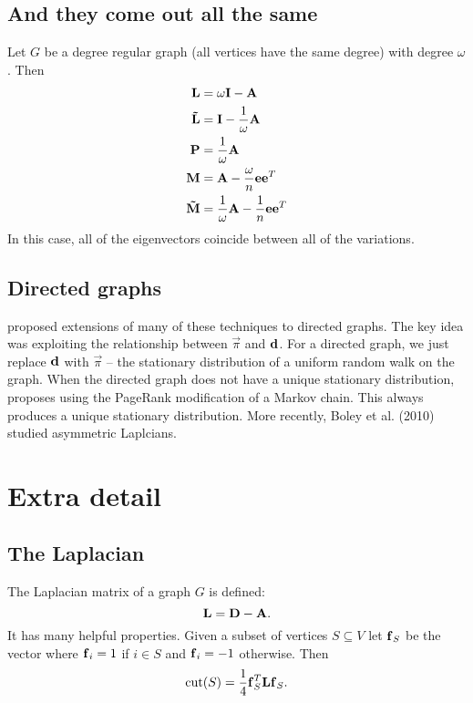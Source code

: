 \documentclass[nofonts]{dgleich-article}
\DeclareMathOperator{\cut}{cut}
\newcommand{\mnL}{\mat{\tilde{L}}}
\newcommand{\mnM}{\mat{\tilde{M}}}
\newcommand{\meye}{\mI}
\renewcommand{\vpi}{\vec{\pi}}
\begin{document}
\subsection{And they come out all the same}

Let $G$ be a degree regular graph (all vertices have
the same degree) with degree $\omega$.  Then 
\[ \begin{aligned}
    \mL & = \omega \meye - \mA \\
    \mnL & = \meye - \frac{1}{\omega} \mA \\
    \mP & = \frac{1}{\omega} \mA \\
    \mM & = \mA - \frac{\omega}{n} \ve \ve^T \\
    \mnM & = \frac{1}{\omega} \mA - \frac{1}{n} \ve \ve^T 
   \end{aligned} \]
In this case, all of the eigenvectors coincide between
all of the variations.  

\subsection{Directed graphs}

\citet{Chung2005-directed-laplacian} proposed extensions of many of these 
techniques to directed graphs.  
The key idea was exploiting the relationship between $\vpi$ and $\boldsymbol{\mathrm{d}}$.
For a directed graph, we just replace $\boldsymbol{\mathrm{d}}$ with $\vpi$ -- the stationary 
distribution of a uniform random walk on the graph.
When the directed graph does not have a unique stationary distribution,
\citet{zhou2005-directed-learning} proposes using the PageRank
modification of a Markov chain.  This always produces a unique stationary
distribution.  More recently, Boley et al. (2010)
studied asymmetric Laplcians.  

\section{Extra detail}

\subsection{The Laplacian}

The Laplacian matrix of a graph $G$ is defined:
\[ \boldsymbol{\mathrm{L}} = \boldsymbol{\mathrm{D}} - \boldsymbol{\mathrm{A}}. \]
It has many helpful properties.  Given a subset of vertices $S \subseteq V$
let  $\boldsymbol{\mathrm{f}}_S$ be the vector where $\boldsymbol{\mathrm{f}}_i = 1$ if $i \in S$ and $\boldsymbol{\mathrm{f}}_i = -1$
otherwise.  Then 
\[ \cut(S) = \frac{1}{4} \vf_S^T \mL \vf_S. \]
\end{document}
